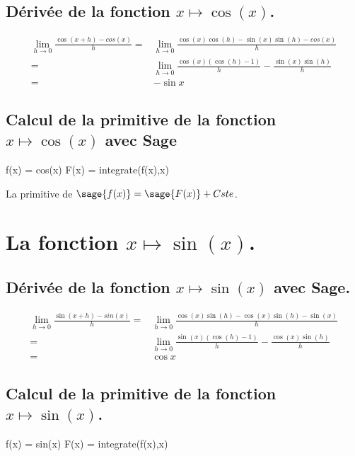 \documentclass[a4paper,14pt]{extreport} %
\begin{document}
\subsection{Dérivée de la fonction $x \mapsto \cos(x)$.}

\begin{align*}
\lim_{h\to 0} \frac{\cos(x+h)-cos(x)}{h} = &\lim_{h\to 0} \frac{\cos(x)\cos(h)-\sin(x)\sin(h)-cos(x)}{h} \\ =& \lim_{h\to 0} \frac{\cos(x)(\cos(h)-1)}{h}-\frac{\sin(x)\sin(h)}{h}\\  =& -\sin{x}
\end{align*}



\subsection{Calcul de la primitive de la fonction  $x \mapsto \cos(x)$ avec Sage}


\begin{sageblock}
    f(x) = cos(x)
    F(x) = integrate(f(x),x)
\end{sageblock}

La primitive de $\sage{f(x)} = \sage{F(x)} + Cste $.



\section{La fonction  $x \mapsto \sin(x)$.}

\subsection{Dérivée de la fonction $x \mapsto \sin(x)$ avec Sage.}


\begin{align*}
\lim_{h\to 0} \frac{\sin(x+h)-sin(x)}{h} =& \lim_{h\to 0} \frac{\cos(x)\sin(h)-\cos(x)\sin(h)-\sin(x)}{h} \\= & \lim_{h\to 0} \frac{\sin(x)(\cos(h)-1)}{h}-\frac{\cos(x)\sin(h)}{h} \\=& \cos{x}
\end{align*}



\subsection{Calcul de la primitive de la fonction  $x \mapsto \sin(x)$.}


\begin{sageblock}
    f(x) = sin(x)
    F(x) = integrate(f(x),x)
\end{sageblock}
\end{document}
